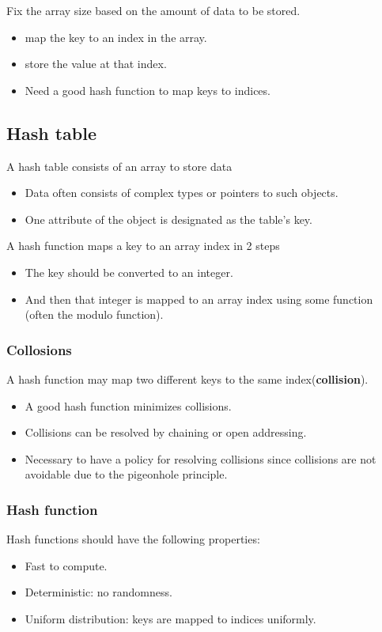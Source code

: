 \documentclass[letterpaper,12pt]{article}
\begin{document}
Fix the array size based on the amount of data to be stored. \begin{itemize}
    \item map the key to an index in the array.
    \item store the value at that index.
    \item Need a good hash function to map keys to indices.
\end{itemize}
\subsection{Hash table}
A hash table consists of an array to store data\begin{itemize}
    \item Data often consists of complex types or pointers to such objects.
    \item One attribute of the object is designated as the table's key.
\end{itemize}
A hash function maps a key to an array index in 2 steps\begin{itemize}
    \item The key should be converted to an integer.
    \item And then that integer is mapped to an array index using some function (often the modulo function).
\end{itemize}
\subsubsection{Collosions}
A hash function may map two different keys to the same index(\textbf{collision}). \begin{itemize}
    \item A good hash function minimizes collisions.
    \item Collisions can be resolved by chaining or open addressing.
    \item Necessary to have a policy for resolving collisions since collisions are not avoidable due to the pigeonhole principle.
\end{itemize}
\subsubsection{Hash function}
Hash functions should have the following properties:\begin{itemize}
    \item Fast to compute.
    \item Deterministic: no randomness.
    \item Uniform distribution: keys are mapped to indices uniformly.
\end{itemize}
\end{document}
